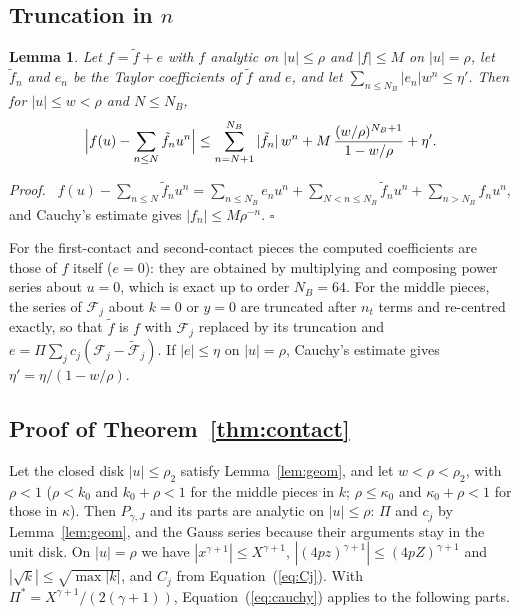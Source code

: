 \documentclass[11pt]{article}
\newtheorem{lemma}{Lemma}
\newenvironment{proof}{\par\noindent\textit{Proof.}\ }{\hfill$\square$\par\medskip}
\begin{document}
\subsection{Truncation in $n$}

\begin{lemma} \label{lem:cauchy}
Let $f=\tilde f+e$ with $f$ analytic on $|u|\le\rho$ and $|f|\le M$ on $|u|=\rho$, let $\tilde f_n$ and $e_n$ be the Taylor coefficients of $\tilde f$ and $e$, and let $\sum_{n\le N_B}|e_n|w^n\le\eta'$. Then for $|u|\le w<\rho$ and $N\le N_B$,
\begin{equation}
\Bigl|f(u)-\sum_{n\le N}\tilde f_nu^n\Bigr|\le\sum_{n=N+1}^{N_B}|\tilde f_n|\,w^n+M\,\frac{(w/\rho)^{N_B+1}}{1-w/\rho}+\eta' . \label{eq:cauchy}
\end{equation}
\end{lemma}

\begin{proof}
$f(u)-\sum_{n\le N}\tilde f_nu^n=\sum_{n\le N_B}e_nu^n+\sum_{N<n\le N_B}\tilde f_nu^n+\sum_{n>N_B}f_nu^n$, and Cauchy's estimate gives $|f_n|\le M\rho^{-n}$.
\end{proof}

For the first-contact and second-contact pieces the computed coefficients are those of $f$ itself ($e=0$): they are obtained by multiplying and composing power series about $u=0$, which is exact up to order $N_B=64$. For the middle pieces, the series of $\mathcal F_j$ about $k=0$ or $y=0$ are truncated after $n_t$ terms and re-centred exactly, so that $\tilde f$ is $f$ with $\mathcal F_j$ replaced by its truncation and $e=\Pi\sum_jc_j(\mathcal F_j-\tilde{\mathcal F}_j)$. If $|e|\le\eta$ on $|u|=\rho$, Cauchy's estimate gives $\eta'=\eta/(1-w/\rho)$.

\subsection{Proof of Theorem~\ref{thm:contact}}

Let the closed disk $|u|\le\rho_2$ satisfy Lemma~\ref{lem:geom}, and let $w<\rho<\rho_2$, with $\rho<1$ ($\rho<k_0$ and $k_0+\rho<1$ for the middle pieces in $k$; $\rho\le\kappa_0$ and $\kappa_0+\rho<1$ for those in $\kappa$). Then $P_{\gamma,J}$ and its parts are analytic on $|u|\le\rho$: $\Pi$ and $c_j$ by Lemma~\ref{lem:geom}, and the Gauss series because their arguments stay in the unit disk. On $|u|=\rho$ we have $|x^{\gamma+1}|\le X^{\gamma+1}$, $|(4pz)^{\gamma+1}|\le(4pZ)^{\gamma+1}$ and $|\sqrt k|\le\sqrt{\max|k|}$, and $C_j$ from Equation~(\ref{eq:Cj}). With $\Pi^*=X^{\gamma+1}/(2(\gamma+1))$, Equation~(\ref{eq:cauchy}) applies to the following parts.
\end{document}
